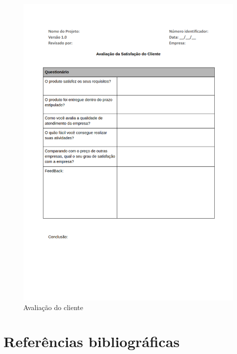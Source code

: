 \documentclass[	DIV=calc,%
							paper=a4,%
							fontsize=12pt,%
							onecolumn]{scrartcl}	 					%
\begin{document}
\begin{figure}
	\centering
	\includegraphics[width=\textwidth]{8.png}
	\caption{Avaliação do cliente}
	\label{Figura 10}
\end{figure}





\section{Referências bibliográficas}
\renewcommand\refname{} %

 
\end{document}
